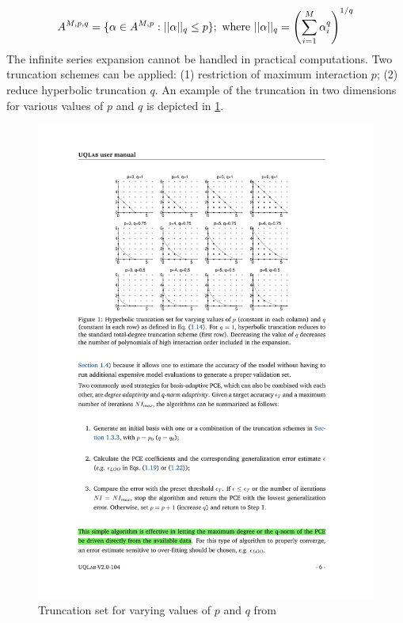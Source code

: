 \begin{equation}
A^{M,p,q} = \{\alpha \in A^{M,p} : ||\alpha||_q \leq p\}; \ {\rm{where}}  \   
||\alpha||_q = \left(\sum_{i=1}^{M} \alpha_i^q\right)^{1/q}
\end{equation}
The infinite series expansion cannot be handled in practical computations. Two truncation schemes can be applied: (1) restriction of maximum interaction $p$; (2) reduce hyperbolic truncation $q$. An example of the truncation in two dimensions for various values of $p$ and $q$ is depicted in \cref{fig: PCE_truncation}.
\begin{figure}[htbp]
    \centering
    \includegraphics[width = 140mm]{Figures/figure-PCE_truncation.pdf}
    \caption{Truncation set for varying values of $p$ and $q$ from \cite{UQdoc}}
    \label{fig: PCE_truncation}
\end{figure}


